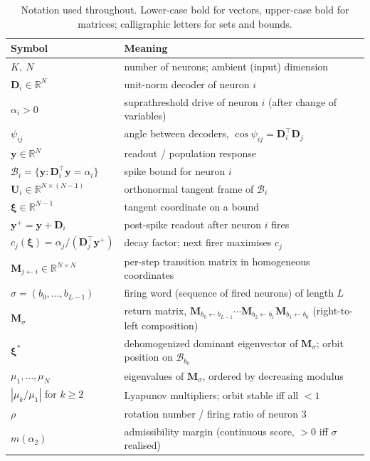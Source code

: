 \documentclass[12pt]{article}
\newcommand{\vv}[1]{\mathbf{#1}}
\newcommand{\DD}{\vv{D}}
\newcommand{\yy}{\vv{y}}
\newcommand{\xxi}{\boldsymbol{\xi}}
\newcommand{\RR}{\mathbb{R}}
\newcommand{\Bsp}{\mathcal{B}}
\begin{document}
\begin{table}[h]
\centering
\small
\renewcommand{\arraystretch}{1.05}
\begin{tabular}{ll}
\hline
Symbol & Meaning \\
\hline
$K,\ N$ & number of neurons; ambient (input) dimension \\
$\DD_i\in\RR^N$ & unit-norm decoder of neuron $i$ \\
$\alpha_i>0$ & suprathreshold drive of neuron $i$ (after change of variables) \\
$\psi_{ij}$ & angle between decoders, $\cos\psi_{ij}=\DD_i^\top\DD_j$ \\
$\yy\in\RR^N$ & readout / population response \\
$\Bsp_i=\{\yy:\DD_i^\top\yy=\alpha_i\}$ & spike bound for neuron $i$ \\
$\vv{U}_i\in\RR^{N\times(N-1)}$ & orthonormal tangent frame of $\Bsp_i$ \\
$\xxi\in\RR^{N-1}$ & tangent coordinate on a bound \\
$\yy^+=\yy+\DD_i$ & post-spike readout after neuron $i$ fires \\
$c_j(\xxi)=\alpha_j/(\DD_j^\top\yy^+)$ & decay factor; next firer maximises $c_j$ \\
$\vv{M}_{j\leftarrow i}\in\RR^{N\times N}$ & per-step transition matrix in homogeneous coordinates \\
$\sigma=(b_0,\ldots,b_{L-1})$ & firing word (sequence of fired neurons) of length $L$ \\
$\vv{M}_\sigma$ & return matrix, $\vv{M}_{b_0\leftarrow b_{L-1}}\cdots\vv{M}_{b_2\leftarrow b_1}\vv{M}_{b_1\leftarrow b_0}$ (right-to-left composition) \\
$\xxi^*$ & dehomogenized dominant eigenvector of $\vv{M}_\sigma$; orbit position on $\Bsp_{b_0}$ \\
$\mu_1,\ldots,\mu_N$ & eigenvalues of $\vv{M}_\sigma$, ordered by decreasing modulus \\
$|\mu_k/\mu_1|$ for $k\geq 2$ & Lyapunov multipliers; orbit stable iff all $<1$ \\
$\rho$ & rotation number / firing ratio of neuron 3 \\
$m(\alpha_2)$ & admissibility margin (continuous score, $>0$ iff $\sigma$ realised) \\
\hline
\end{tabular}
\caption{Notation used throughout. Lower-case bold for vectors, upper-case bold for matrices; calligraphic letters for sets and bounds.}
\label{tab:notation}
\end{table}
\end{document}
